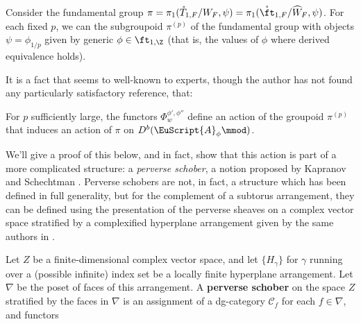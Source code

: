 Consider the fundamental group $\pi=\pi_1(\mathring{T}_{1,F}/W_F,\psi)=\pi_1(\mathring{\ft}_{1,F}/\widehat{W}_F,\psi)$. %
For each fixed $p$, we can the subgroupoid $\pi^{(p)}$ of the fundamental group with objects $\psi=\phi_{1/p}$ given by generic $\phi\in \ft_{1,\Z}$ (that is, the values of $\phi$ where derived equivalence holds).  

It is a fact that seems to well-known to experts, though the author has not found any particularly satisfactory reference, that:
\begin{proposition}
For $p$ sufficiently large,  the functors $\Phi_w^{\phi',\phi''}$  define an action of the groupoid $\pi^{(p)}$ that induces an action of $\pi$ on $D^b(\EuScript{A}_{\phi}\mmod)$.
\end{proposition}
We'll give a proof of this below, and in fact, show that this action is part of a more complicated structure: a {\it perverse schober}, a notion proposed by Kapranov and Schechtman \cite{KSschobers}.  Perverse schobers are not, in fact, a structure which has been defined in full generality, but for the complement of a subtorus arrangement, they can be defined using the presentation of the perverse sheaves on a complex vector space stratified by a complexified hyperplane arrangement given by the same authors in \cite{KShyperplane}.
\begin{definition}
  Let $Z$ be a finite-dimensional complex vector space, and let $\{H_\gamma\}$ for $\gamma$ running over a (possible infinite) index set be a locally finite hyperplane arrangement.  Let $\nabla$ be the poset of faces of this arrangement.  A {\bf perverse schober} on the space $Z$ stratified by the faces in $\nabla$ is an assignment of a dg-category $\mathcal{C}_f$ for each $f\in \nabla$, and functors   
\end{definition}




